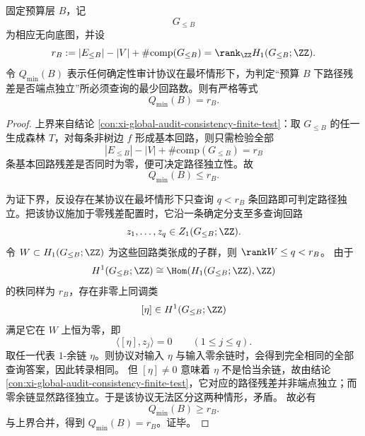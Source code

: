 \begin{theorem}\label{thm:conclusion-boundary-path-independence-query-complexity-equals-betti}
固定预算层 \(B\)，记
\[
G_{\le B}
\]
为相应无向底图，并设
\[
r_B:=|E_{\le B}|-|V|+\#\mathrm{comp}(G_{\le B})
=
\rank_{\ZZ}H_1(G_{\le B};\ZZ).
\]
令 \(Q_{\min}(B)\) 表示任何确定性审计协议在最坏情形下，为判定“预算 \(B\) 下路径残差是否端点独立”所必须查询的最少回路数。则有严格等式
\[
\boxed{\;Q_{\min}(B)=r_B.\;}
\]
\end{theorem}
\begin{proof}
上界来自结论 \ref{con:xi-global-audit-consistency-finite-test}：取 \(G_{\le B}\) 的任一生成森林 \(T\)，对每条非树边 \(f\) 形成基本回路，则只需检验全部
\[
|E_{\le B}|-|V|+\#\mathrm{comp}(G_{\le B})=r_B
\]
条基本回路残差是否同时为零，便可决定路径独立性。故
\[
Q_{\min}(B)\le r_B.
\]

为证下界，反设存在某协议在最坏情形下只查询 \(q<r_B\) 条回路即可判定路径独立。把该协议施加于零残差配置时，它沿一条确定分支至多查询回路
\[
z_1,\dots,z_q\in Z_1(G_{\le B};\ZZ).
\]
令 \(W\subset H_1(G_{\le B};\ZZ)\) 为这些回路类张成的子群，则 \(\rank W\le q<r_B\)。
由于
\[
H^1(G_{\le B};\ZZ)\cong \Hom(H_1(G_{\le B};\ZZ),\ZZ)
\]
的秩同样为 \(r_B\)，存在非零上同调类
\[
[\eta]\in H^1(G_{\le B};\ZZ)
\]
满足它在 \(W\) 上恒为零，即
\[
\langle [\eta],z_j\rangle=0
\qquad (1\le j\le q).
\]
取任一代表 \(1\)-余链 \(\eta\)。则协议对输入 \(\eta\) 与输入零余链时，会得到完全相同的全部查询答案，因此转录相同。
但 \([\eta]\neq 0\) 意味着 \(\eta\) 不是恰当余链，故由结论 \ref{con:xi-global-audit-consistency-finite-test}，它对应的路径残差并非端点独立；而零余链显然路径独立。于是该协议无法区分这两种情形，矛盾。
故必有
\[
Q_{\min}(B)\ge r_B.
\]
与上界合并，得到 \(Q_{\min}(B)=r_B\)。证毕。
\end{proof}

